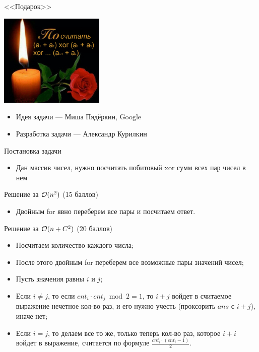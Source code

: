 \begin{frame}
  \begin{center}
    \LARGE <<Подарок>>
  \end{center}

  \begin{center}
      \includegraphics[width=5cm]{memes/e-meme.png}
  \end{center}

  \begin{itemize}
  \item Идея задачи --- Миша Пядёркин, Google
  \item Разработка задачи --- Александр Курилкин
  \end{itemize}

\end{frame}

\begin{frame}{Постановка задачи}

  \begin{itemize}
  \item Дан массив чисел, нужно посчитать побитовый xor сумм всех пар чисел в нем
  \end{itemize}

\end{frame}

\begin{frame}{Решение за $\mathcal{O}(n^2)$ (15 баллов)}
  \begin{itemize}
  \item Двойным for явно переберем все пары и посчитаем ответ.
  \end{itemize}
\end{frame}

\begin{frame}{Решение за $\mathcal{O}(n + C^2)$ (20 баллов)}
  \begin{itemize}
  \item Посчитаем количество каждого числа;
  \item После этого двойным for переберем все возможные пары значений чисел;
  \item Пусть значения равны $i$ и $j$;
  \item Если $i \neq j$, то если $cnt_i \cdot cnt_j \bmod 2 = 1$, то $i + j$ войдет в считаемое выражение нечетное кол-во раз, и его нужно учесть (проксорить $ans$ с $i + j$), иначе нет;
  \item Если $i = j$, то делаем все то же, только теперь кол-во раз, которое $i + i$ войдет в выражение, считается по формуле $\frac{cnt_i \cdot (cnt_{i} - 1)}{2}$.
  \end{itemize}
\end{frame}

